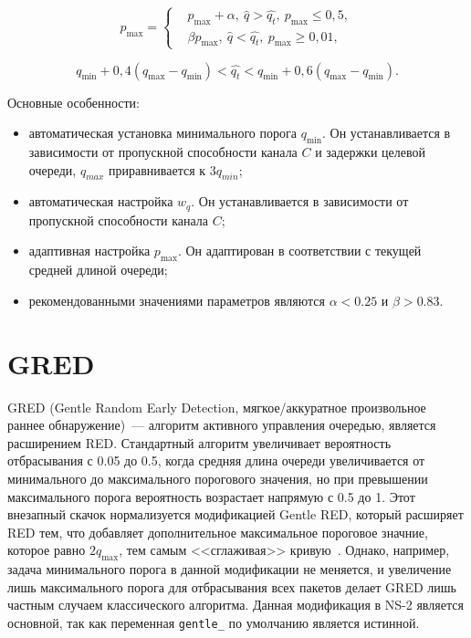 \begin{equation}
\label{ad1}
p_{\max} = \left\{
  \begin{aligned}
    & p_{\max}+\alpha, \ \hat{q}>\hat{q_{t}}, \ p_{\max} \leqslant 0,5, \\
    & \beta p_{\max}, \ \hat{q}<\hat{q_{t}}, \ p_{\max} \geqslant 0,01, 
  \end{aligned}
\right.
\end{equation}

\begin{equation}
\label{ad2}
q_{\min}+0,4(q_{\max}-q_{\min}) < \hat{q_t} < q_{\min}+0,6\left(q_{\max}-q_{\min}\right).
\end{equation}

Основные особенности: 
\begin{itemize}
\item автоматическая установка минимального порога $q_{\min}$. Он
  устанавливается в зависимости от пропускной способности канала $C$ и
  задержки целевой очереди, $q_{max}$ приравнивается к $3q_{min}$;
\item автоматическая настройка $w_{q}$. Он устанавливается в
  зависимости от пропускной способности канала $C$;
\item адаптивная настройка $p_{\max}$. Он адаптирован в соответствии с
  текущей средней длиной очереди;
\item рекомендованными значениями параметров являются $\alpha < 0.25 $ и $\beta > 0.83 $.
\end{itemize}



\section{GRED}
\label{chap2:sec3}
 

GRED (Gentle Random Early Detection, мягкое/аккуратное произвольное
раннее обнаружение)~--- алгоритм активного управления очередью,
является расширением RED. Стандартный алгоритм увеличивает
вероятность отбрасывания с 0.05 до 0.5, когда средняя длина очереди
увеличивается от минимального до максимального порогового значения, но
при превышении максимального порога вероятность возрастает напрямую с
0.5 до 1.  Этот внезапный скачок нормализуется модификацией Gentle
RED, который расширяет RED тем, что добавляет дополнительное
максимальное пороговое значние, которое равно $2q_{\max}$, тем самым
<<сглаживая>> кривую~\cite{GRED}. Однако, например, задача минимального порога в данной модификации не меняется, 
и увеличение лишь максимального порога для отбрасывания всех пакетов делает GRED лишь частным случаем классического алгоритма. 
Данная модификация в NS-2 является основной, так как переменная \verb|gentle_| по умолчанию 
является истинной. 

